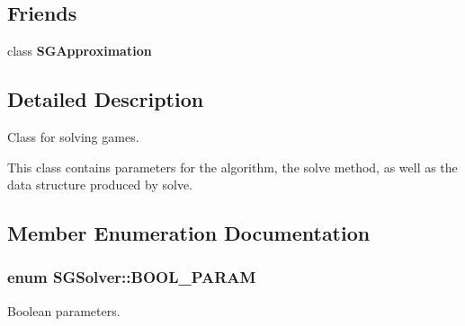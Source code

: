 \subsection*{Friends}
\begin{DoxyCompactItemize}
\item 
\hypertarget{class_s_g_solver_adaa41c100279e40c34d42b18d0c2ed21}{class {\bfseries S\+G\+Approximation}}\label{class_s_g_solver_adaa41c100279e40c34d42b18d0c2ed21}

\end{DoxyCompactItemize}


\subsection{Detailed Description}
Class for solving games. 

This class contains parameters for the algorithm, the solve method, as well as the data structure produced by solve. 

\subsection{Member Enumeration Documentation}
\hypertarget{class_s_g_solver_a8de18768065063c3641acbb1b3fcd844}{
\subsubsection[{B\+O\+O\+L\+\_\+\+P\+A\+R\+A\+M}]{\setlength{\rightskip}{0pt plus 5cm}enum {\bf S\+G\+Solver\+::\+B\+O\+O\+L\+\_\+\+P\+A\+R\+A\+M}}}\label{class_s_g_solver_a8de18768065063c3641acbb1b3fcd844}


Boolean parameters. 

